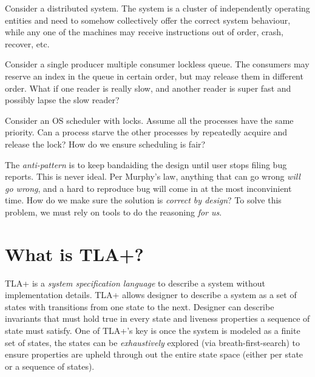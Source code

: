 Consider a distributed system. The system is a cluster of independently
operating entities and need to somehow collectively offer the correct system
behaviour, while any one of the machines may receive instructions out of order,
crash, recover, etc. \newline

Consider a single producer multiple consumer lockless queue. The consumers may 
reserve an index in the queue in certain order, but may release them in different order. 
What if one reader is really slow, and another reader is super fast and possibly 
lapse the slow reader? \newline

Consider an OS scheduler with locks. Assume all the processes have the same
priority. Can a process starve the other processes by repeatedly acquire and
release the lock? How do we ensure scheduling is fair?\newline


The \textit{anti-pattern} is to keep bandaiding the design until user stops
filing bug reports. This is never ideal. Per Murphy's law, anything that can go
wrong \textit{will go wrong}, and a hard to reproduce bug will come in at the
most inconvinient time. How do we make sure the solution is \textit{correct by
design}? To solve this problem, we must rely on tools to do the reasoning
\textit{for us}.

\section{What is TLA+?}

TLA+ is a \textit{system specification language} to describe a system without
implementation details. TLA+ allows designer to describe a system as a set of
states with transitions from one state to the next. Designer can describe
invariants that must hold true in every state and liveness properties a sequence
of state must satisfy. One of TLA+'s key is once the system is modeled as a
finite set of states, the states can be \textit{exhaustively} explored (via
breath-first-search) to ensure properties are upheld through out the entire state
space (either per state or a sequence of states).\newline

